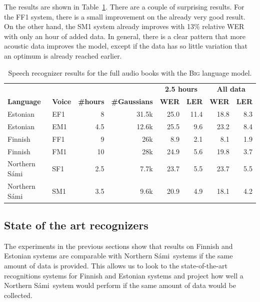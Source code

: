 \documentclass[b5paper]{article}
\newcommand{\ns}{Northern Sámi}
\newcommand{\ds}[1]{\textsc{#1}}
\begin{document}
The results are shown in Table~\ref{tbl:resultbigcomp}.  There are a couple of surprising results. For the FF1 system, there is a small improvement on the already very good result. On the other hand, the SM1 system already improves with 13\% relative WER with only an hour of added data. In general, there is a clear pattern that more acoustic data improves the model, except if the data has so little variation that an optimum is already reached earlier.



\begin{table}
\centering
\begin{tabular}{llrr|rr|rr}
& & & & \multicolumn{2}{|c}{\textbf{2.5 hours}} & \multicolumn{2}{|c}{\textbf{All data}} \\
\textbf{Language} & \textbf{Voice} & \textbf{\#hours}  &\textbf{\#Gaussians} & \textbf{WER} & \textbf{LER}& \textbf{{WER}} & \textbf{LER} \\\hline %
Estonian & EF1 & 8 &31.5k & 25.0  & 11.4 & 18.8 & 8.3  \\
Estonian & EM1& 4.5& 12.6k&25.5 & 9.6  & 23.2 & 8.4  \\
Finnish & FF1 & 9 & 26k & 8.9 & 2.1  & 8.1 &  1.9  \\
Finnish & FM1 & 10 & 28k & 24.9 & 5.6  & 19.8  & 3.7    \\
\ns & SF1 & 2.5   & 7.7k & 23.7  & 5.5  & 23.7  & 5.5  \\
\ns &SM1 & 3.5 &9.6k & 20.9 & 4.9  & 18.1  & 4.2   \\
\end{tabular}
\caption{Speech recognizer results for the full audio books with the \ds{Big} language model.\label{tbl:resultbigcomp}}
\end{table}


\subsection{State of the art recognizers}
The experiments in the previous sections show that results on Finnish and Estonian systems are comparable with \ns\ systems if the same amount of data is provided. This allows us to look to the state-of-the-art recognitions systems for Finnish and Estonian systems and project how well a \ns\ system would perform if the same amount of data would be collected.
\end{document}

